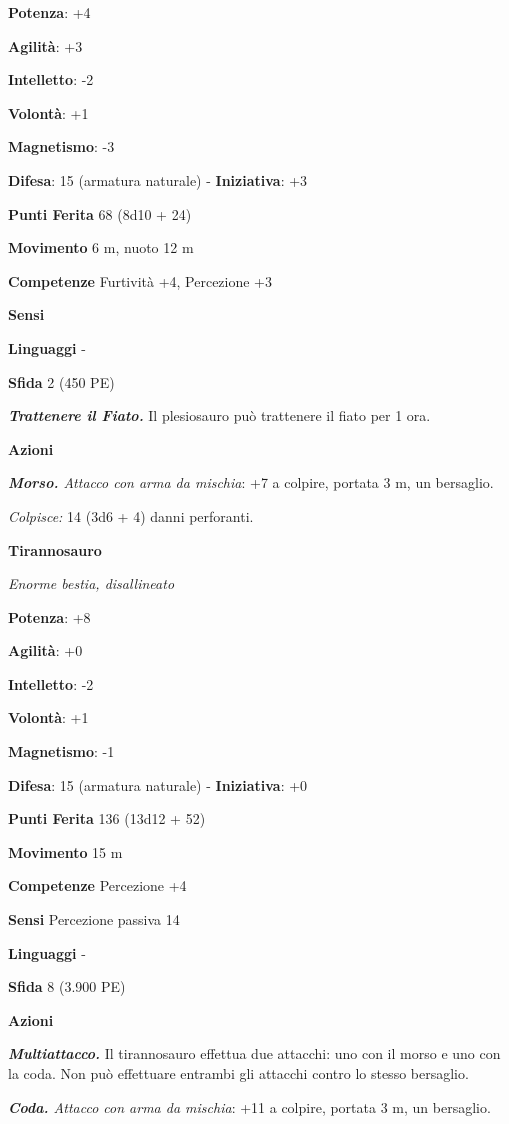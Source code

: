 \begin{multicols}{2}
\textbf{Potenza}: +4

\textbf{Agilità}: +3

\textbf{Intelletto}: -2

\textbf{Volontà}: +1

\textbf{Magnetismo}: -3

\textbf{Difesa}: 15 (armatura naturale) - \textbf{Iniziativa}: +3

\textbf{Punti Ferita} 68 (8d10 + 24)

\textbf{Movimento} 6 m, nuoto 12 m

\textbf{Competenze} Furtività +4, Percezione +3

\textbf{Sensi} 

\textbf{Linguaggi} -

\textbf{Sfida} 2 (450 PE)\smallskip

\emph{\textbf{Trattenere il Fiato.}} Il plesiosauro può trattenere il
fiato per 1 ora.

\smallskip\textbf{Azioni}

\emph{\textbf{Morso.} Attacco con arma da mischia}: +7 a colpire,
portata 3 m, un bersaglio.

\emph{Colpisce:} 14 (3d6 + 4) danni perforanti.

\textbf{Tirannosauro}

\emph{Enorme bestia, disallineato}

\textbf{Potenza}: +8

\textbf{Agilità}: +0

\textbf{Intelletto}: -2

\textbf{Volontà}: +1

\textbf{Magnetismo}: -1

\textbf{Difesa}: 15 (armatura naturale) - \textbf{Iniziativa}: +0

\textbf{Punti Ferita} 136 (13d12 + 52)

\textbf{Movimento} 15 m

\textbf{Competenze} Percezione +4

\textbf{Sensi} Percezione passiva 14

\textbf{Linguaggi} -

\textbf{Sfida} 8 (3.900 PE)\smallskip

\smallskip\textbf{Azioni}

\emph{\textbf{Multiattacco.}} Il tirannosauro effettua due attacchi: uno
con il morso e uno con la coda. Non può effettuare entrambi gli attacchi
contro lo stesso bersaglio.

\emph{\textbf{Coda.} Attacco con arma da mischia}: +11 a colpire,
portata 3 m, un bersaglio.


\end{multicols}
